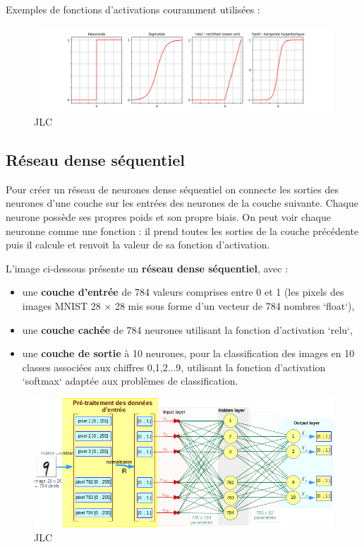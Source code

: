 \documentclass{article}
\begin{document}
Exemples de fonctions d'activations couramment utilisées :

\begin{figure}[H]
\centering
\includegraphics[width=1\textwidth]{img/activationFunctions.png}
JLC
\end{figure}

\subsection{Réseau dense séquentiel}

Pour créer un réseau de neurones dense séquentiel on connecte les sorties 
des neurones d'une couche sur les entrées des neurones de la couche suivante. 
Chaque neurone possède ses propres poids et son propre biais. 
On peut voir chaque neuronne comme une fonction : 
il prend toutes les sorties de la couche précédente 
puis il calcule et renvoit la valeur de sa fonction d'activation.

\bigskip

L'image ci-dessous présente un \textbf{réseau dense séquentiel}, avec :

\begin{itemize}

\item une \textbf{couche d'entrée} de 784 valeurs comprises entre 0 et 1 (les pixels des 
images MNIST 28 $\times$ 28 mis sous forme d'un vecteur de 784 nombres `float`),

\item une \textbf{couche cachée} de 784 neurones utilisant la fonction d'activation `relu`,

\item une \textbf{couche de sortie} à 10 neurones, pour la classification des images en 10 
classes associées aux chiffres {0,1,2...9}, utilisant la fonction d'activation 
`softmax` adaptée aux problèmes de classification.

\end{itemize}

\begin{figure}[H]
\centering
\includegraphics[width=1\textwidth]{img/archiReseau.png}
JLC
\end{figure}
\end{document}

